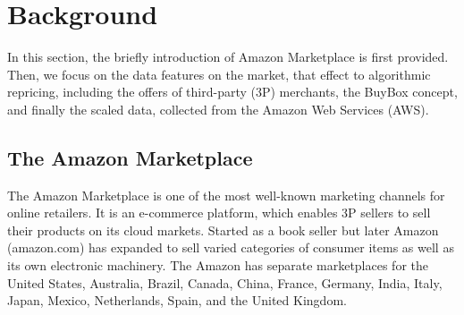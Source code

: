 \section{Background}
\label{sec:Background}
In this section, the briefly introduction of Amazon Marketplace is first provided. Then, we focus on the data features on the market, that effect to algorithmic repricing, including the offers of third-party (3P) merchants, the BuyBox concept, and finally the scaled data, collected from the Amazon Web Services (AWS).

\subsection{The Amazon Marketplace}
\label{sec:amzintro}
The Amazon Marketplace is one of the most well-known marketing channels for online retailers. It is an e-commerce platform, which enables 3P sellers to sell their products on its cloud markets. Started as a book seller but later Amazon (amazon.com) has expanded to sell varied categories of consumer items as well as its own electronic machinery. The Amazon has separate marketplaces for the United States, Australia, Brazil, Canada, China, France, Germany, India, Italy, Japan, Mexico, Netherlands, Spain, and the United Kingdom.

